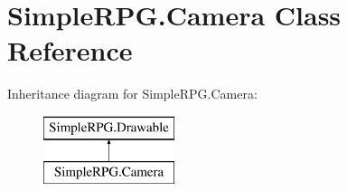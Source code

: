 \hypertarget{class_simple_r_p_g_1_1_camera}{\section{Simple\+R\+P\+G.\+Camera Class Reference}
\label{class_simple_r_p_g_1_1_camera}
}
Inheritance diagram for Simple\+R\+P\+G.\+Camera\+:\begin{figure}[H]
\begin{center}
\leavevmode
\includegraphics[height=2.000000cm]{class_simple_r_p_g_1_1_camera}
\end{center}
\end{figure}
